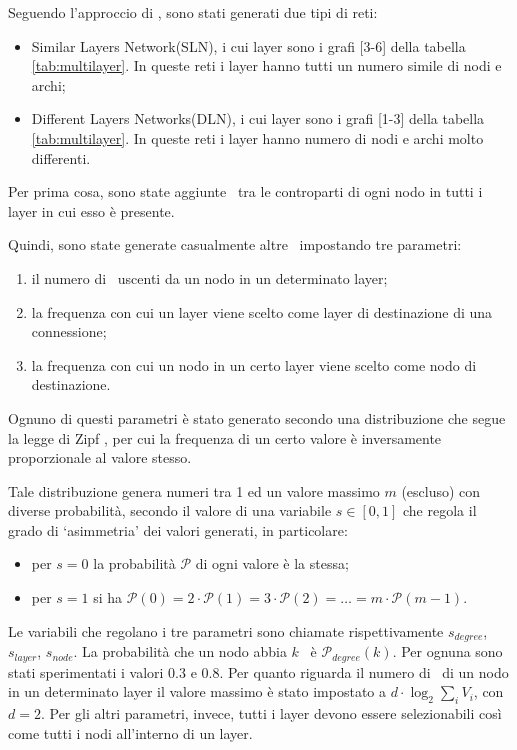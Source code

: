 Seguendo l'approccio di \cite{basaras:infspmul}, sono stati generati due tipi di reti:
\begin{itemize}
    \item Similar Layers Network(SLN), i cui layer sono i grafi [3-6] della  
            tabella \vref{tab:multilayer}. In queste reti i layer hanno tutti un numero simile 
            di nodi e archi;
    \item Different Layers Networks(DLN), i cui layer sono i grafi [1-3] della tabella 
        \ref{tab:multilayer}. In queste reti i layer hanno numero di nodi e archi molto differenti.
\end{itemize}


Per prima cosa, sono state aggiunte \interc\ tra le controparti di ogni nodo in tutti 
i layer in cui esso è presente.

Quindi, sono state generate casualmente altre \interc\ impostando tre parametri:
\begin{enumerate}
    \item il numero di \interc\ uscenti da un nodo in un determinato layer;
    \item la frequenza con cui un layer viene scelto come layer di destinazione di 
        una connessione;
    \item la frequenza con cui un nodo in un certo layer viene scelto come nodo 
        di destinazione. 
\end{enumerate}
Ognuno di questi parametri è stato generato secondo una distribuzione che segue 
la legge di Zipf \cite{zipf:humanb}, per cui la frequenza di un certo valore è inversamente
proporzionale al valore stesso. 

Tale distribuzione genera numeri tra 1 ed un valore massimo $m$ (escluso) con diverse probabilità,
secondo il valore di una variabile $s \in [0, 1]$
che regola il grado di `asimmetria' dei valori generati, in particolare:
\begin{itemize}
    \item per $s=0$ la probabilità $\mathcal{P}$ di ogni valore è la stessa;  
    \item per $s=1$ si ha $\mathcal{P}(0) = 2 \cdot \mathcal{P}(1) = 3 \cdot \mathcal{P}(2) =\dots = m \cdot \mathcal{P}(m-1)$. 
\end{itemize}

Le variabili che regolano i tre parametri sono chiamate rispettivamente
$s_{degree}$, $s_{layer}$, $s_{node}$. La probabilità che un nodo abbia $k$ \interc\ è $\mathcal{P}_{degree}(k)$.
Per ognuna sono stati sperimentati i valori $0.3$ e $0.8$. 
Per quanto riguarda il numero di \interc\ di un nodo in un determinato layer
il valore massimo è stato impostato a $d \cdot \log_2{\sum_{i}{V_i}}$, con 
$d = 2$. Per gli altri parametri, invece, tutti i layer devono essere selezionabili
così come tutti i nodi all'interno di un layer.

